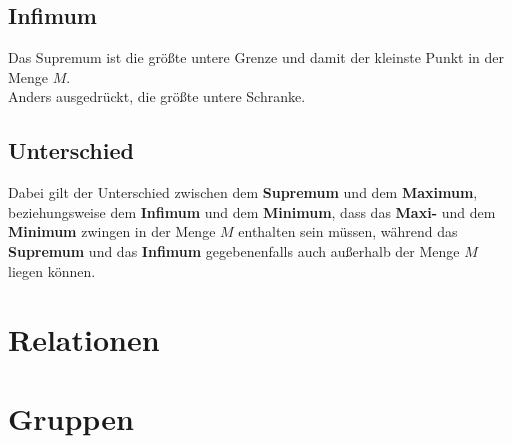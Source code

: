 \documentclass[11pt]{article}
\begin{document}
    \subsection{Infimum}\label{subsec:infimum}
    Das Supremum ist die größte untere Grenze und damit der kleinste Punkt in der Menge $M$.\\
    Anders ausgedrückt, die größte untere Schranke.

    \subsection{Unterschied}\label{subsec:unterschied}
    Dabei gilt der Unterschied zwischen dem \textbf{Supremum} und dem \textbf{Maximum}, beziehungsweise dem \textbf{Infimum} und dem \textbf{Minimum}, dass
    das \textbf{Maxi-} und dem \textbf{Minimum} zwingen in der Menge $M$ enthalten sein müssen, während das \textbf{Supremum} und das \textbf{Infimum} gegebenenfalls auch außerhalb der Menge $M$ liegen können.

    \section{Relationen}\label{sec:relationen}
    

    \section{Gruppen}\label{sec:gruppen}
    
\end{document}
